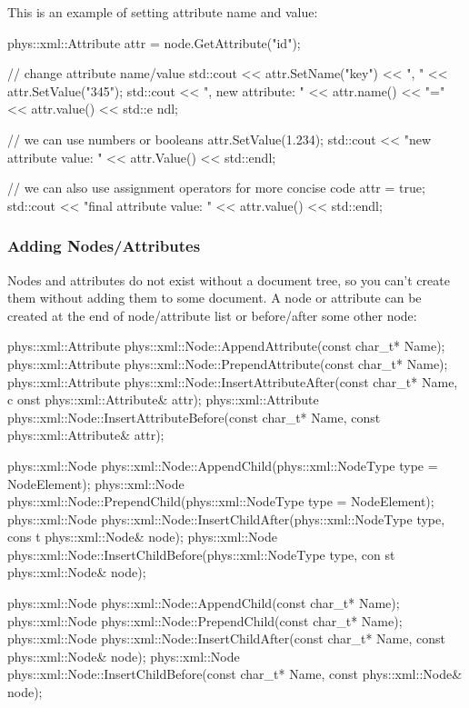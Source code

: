  \par
 This is an example of setting attribute name and value: 
\begin{DoxyCode}
 phys::xml::Attribute attr = node.GetAttribute("id");

 // change attribute name/value
 std::cout << attr.SetName("key") << ", " << attr.SetValue("345");
 std::cout << ", new attribute: " << attr.name() << "=" << attr.value() << std::e
      ndl;

 // we can use numbers or booleans
 attr.SetValue(1.234);
 std::cout << "new attribute value: " << attr.Value() << std::endl;

 // we can also use assignment operators for more concise code
 attr = true;
 std::cout << "final attribute value: " << attr.value() << std::endl;
\end{DoxyCode}
 \hypertarget{XMLManual_XMLModifyingAdding}{}\subsubsection{Adding Nodes/Attributes}\label{XMLManual_XMLModifyingAdding}
Nodes and attributes do not exist without a document tree, so you can't create them without adding them to some document. A node or attribute can be created at the end of node/attribute list or before/after some other node: 
\begin{DoxyCode}
 phys::xml::Attribute phys::xml::Node::AppendAttribute(const char_t* Name);
 phys::xml::Attribute phys::xml::Node::PrependAttribute(const char_t* Name);
 phys::xml::Attribute phys::xml::Node::InsertAttributeAfter(const char_t* Name, c
      onst phys::xml::Attribute& attr);
 phys::xml::Attribute phys::xml::Node::InsertAttributeBefore(const char_t* Name, 
      const phys::xml::Attribute& attr);

 phys::xml::Node phys::xml::Node::AppendChild(phys::xml::NodeType type = 
      NodeElement);
 phys::xml::Node phys::xml::Node::PrependChild(phys::xml::NodeType type = 
      NodeElement);
 phys::xml::Node phys::xml::Node::InsertChildAfter(phys::xml::NodeType type, cons
      t phys::xml::Node& node);
 phys::xml::Node phys::xml::Node::InsertChildBefore(phys::xml::NodeType type, con
      st phys::xml::Node& node);

 phys::xml::Node phys::xml::Node::AppendChild(const char_t* Name);
 phys::xml::Node phys::xml::Node::PrependChild(const char_t* Name);
 phys::xml::Node phys::xml::Node::InsertChildAfter(const char_t* Name, const 
      phys::xml::Node& node);
 phys::xml::Node phys::xml::Node::InsertChildBefore(const char_t* Name, const 
      phys::xml::Node& node);
\end{DoxyCode}
